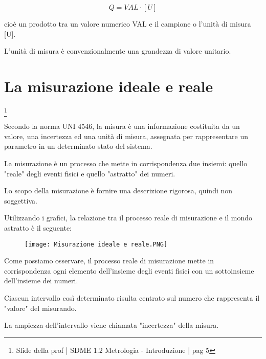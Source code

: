 {
    \Large 
    \begin{equation}
        Q = VAL \cdot [U]
    \end{equation}
    
}

cioè un prodotto tra un valore numerico VAL e il campione o l'unità di misura [U]. \newline 

L'unità di misura è convenzionalmente una grandezza di valore unitario. \newline 

\newpage 

\section{La misurazione ideale e reale}
\footnote{Slide della prof | SDME 1.2 Metrologia - Introduzione | pag 5}


Secondo la norma UNI 4546, la misura è una informazione costituita da un valore, una incertezza ed una unità di misura, 
assegnata per rappresentare un parametro in un determinato stato del sistema. \newline 

La misurazione è un processo che mette in corrispondenza due insiemi: 
quello "reale" degli eventi fisici e quello "astratto" dei numeri. \newline 

Lo scopo della misurazione è fornire una descrizione rigorosa, quindi non soggettiva. \newline 

Utilizzando i grafici, la relazione tra il processo reale di misurazione e il mondo astratto è il seguente: 

\begin{figure}[h]
    \centering
    \texttt{[image: Misurazione ideale e reale.PNG]}
\end{figure}

Come possiamo osservare, il processo reale di misurazione mette in corrispondenza ogni elemento 
dell'insieme degli eventi fisici con un sottoinsieme dell'insieme dei numeri. \newline 

Ciascun intervallo così determinato risulta centrato sul numero che rappresenta il "valore" del misurando. \newline 

La ampiezza dell'intervallo viene chiamata "incertezza" della misura. \newline 

